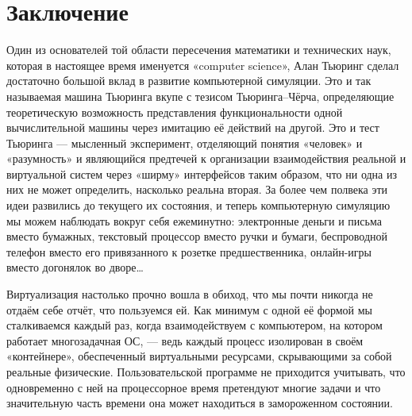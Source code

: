 
\chapter{Заключение}\label{afterword}



Один из основателей той области пересечения математики и технических наук, которая в настоящее время именуется «computer science», Алан Тьюринг сделал достаточно большой вклад в развитие компьютерной симуляции. Это и так называемая машина Тьюринга вкупе с тезисом Тьюринга--Чёрча, определяющие теоретическую возможность представления функциональности одной вычислительной машины через имитацию её действий на другой. Это и тест Тьюринга — мысленный эксперимент, отделяющий понятия «человек» и «разумность» и являющийся предтечей к  организации взаимодействия реальной и виртуальной систем через «ширму» интерфейсов таким образом, что ни одна из них не может определить, насколько реальна вторая. За более чем полвека эти идеи развились до текущего их состояния, и теперь компьютерную симуляцию мы можем наблюдать вокруг себя ежеминутно: электронные деньги и письма вместо бумажных, текстовый процессор вместо ручки и бумаги, беспроводной телефон вместо его привязанного к розетке предшественника, онлайн-игры вместо догонялок во дворе\dots

Виртуализация настолько прочно вошла в обиход, что мы почти никогда не отдаём себе отчёт, что пользуемся ей. Как минимум с одной её формой мы сталкиваемся каждый раз, когда взаимодействуем с компьютером, на котором работает многозадачная ОС, — ведь каждый процесс изолирован в своём «контейнере», обеспеченный виртуальными ресурсами, скрывающими за собой реальные физические. Пользовательской программе не приходится учитывать, что одновременно с ней на процессорное время претендуют многие задачи и что значительную часть времени она может находиться в замороженном состоянии.

